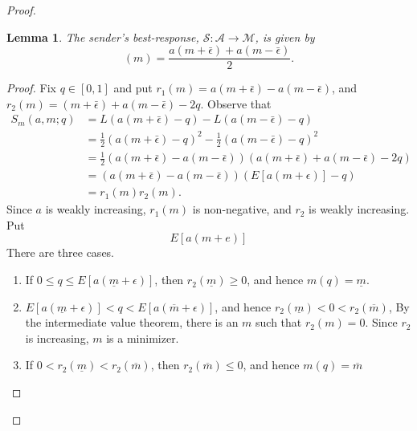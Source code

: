 \documentclass[12pt]{article}
\newtheorem{lemma}{Lemma}
\begin{document}
\begin{proof}
\begin{lemma}\label{lemma:message}
The sender's best-response, $\mathcal{S}:\mathcal{A}\rightarrow\mathcal{M}$, is given by
\begin{equation}
[\mathcal{S}a](m)=\frac{a(m+\bar{\epsilon})+a(m-\bar{\epsilon})}{2}.
\end{equation}
\end{lemma}
\begin{proof}
Fix $q\in[0,1]$ and put $r_{1}(m)=a(m+\bar{\epsilon})-a(m-\bar{\epsilon})$, and $r_{2}(m)=(m+\bar{\epsilon})+a(m-\bar{\epsilon})-2q$. Observe that
\begin{align}
S_{m}(a,m;q)&=L(a(m+\bar{\epsilon})-q)-L(a(m-\bar{\epsilon})-q)\\
&=\frac{1}{2}(a(m+\bar{\epsilon})-q)^{2}-\frac{1}{2}(a(m-\bar{\epsilon})-q)^{2}\\
&=\frac{1}{2}(a(m+\bar{\epsilon})-a(m-\bar{\epsilon}))(a(m+\bar{\epsilon})+a(m-\bar{\epsilon})-2q)\\
&=(a(m+\bar{\epsilon})-a(m-\bar{\epsilon}))(E[a(m+\epsilon)]-q)\\
&=r_{1}(m)r_{2}(m).
\end{align}
Since $a$ is weakly increasing, $r_{1}(m)$ is non-negative, and $r_{2}$ is weakly increasing. Put
\begin{equation}
E[a(m+e)]
\end{equation}
There are three cases. 
\begin{enumerate}
\item If $0\leq q\leq E[a(\underline{m}+\epsilon)]$, then $r_{2}(\underline{m})\geq0$, and hence $m(q)=\underline{m}$. 
\item $E[a(\underline{m}+\epsilon)]<q<E[a(\overline{m}+\epsilon)]$, and hence $r_{2}(\underline{m})<0<r_{2}(\overline{m})$, By the intermediate value theorem, there is an $m$ such that $r_{2}(m)=0$. Since $r_{2}$ is increasing, $m$ is a minimizer. 
\item If $0<r_{2}(\underline{m})<r_{2}(\overline{m})$, then $r_{2}(\overline{m})\leq0$, and hence $m(q)=\overline{m}$
\end{enumerate}
\end{proof}


\end{proof}
\end{document}
